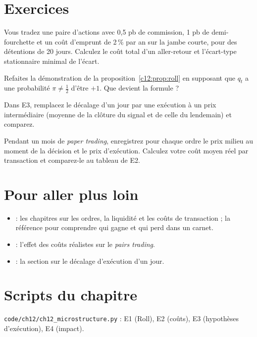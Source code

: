 \section{Exercices}

\begin{exercise}
Vous tradez une paire d'actions avec 0,5 pb de commission, 1 pb de demi-fourchette et un coût d'emprunt de 2\,\% par an sur la jambe courte, pour des détentions de 20 jours. Calculez le coût total d'un aller-retour et l'écart-type stationnaire minimal de l'écart.
\end{exercise}

\begin{exercise}
Refaites la démonstration de la proposition~\ref{c12:prop:roll} en supposant que $q_t$ a une probabilité $\pi\ne\frac12$ d'être $+1$. Que devient la formule ?
\end{exercise}

\begin{exercise}[à coder]
Dans E3, remplacez le décalage d'un jour par une exécution à un prix intermédiaire (moyenne de la clôture du signal et de celle du lendemain) et comparez.
\end{exercise}

\begin{exercise}
Pendant un mois de \emph{paper trading}, enregistrez pour chaque ordre le prix milieu au moment de la décision et le prix d'exécution. Calculez votre coût moyen réel par transaction et comparez-le au tableau de E2.
\end{exercise}

\section{Pour aller plus loin}

\begin{toread}
\begin{itemize}[leftmargin=1.2em]
\item \citet{harris2003} : les chapitres sur les ordres, la liquidité et les coûts de transaction ; la référence pour comprendre qui gagne et qui perd dans un carnet.
\item \citet{dofaff2012} : l'effet des coûts réalistes sur le \emph{pairs trading}.
\item \citet{gatev2006} : la section sur le décalage d'exécution d'un jour.
\end{itemize}
\end{toread}

\section{Scripts du chapitre}
\noindent\texttt{code/ch12/ch12\_microstructure.py} : E1 (Roll), E2 (coûts), E3 (hypothèses d'exécution), E4 (impact).

